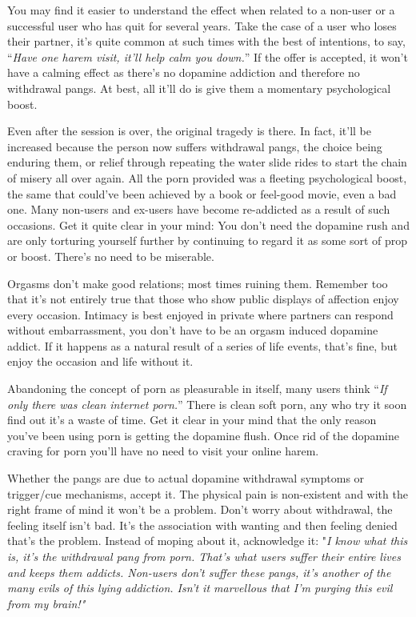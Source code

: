 \documentclass[
]{book}
\begin{document}
You may find it easier to understand the effect when related to a non-user or a successful user who has quit for several years. Take the case of a user who loses their partner, it's quite common at such times with the best of intentions, to say, ``\emph{Have one harem visit, it'll help calm you down.}'' If the offer is accepted, it won't have a calming effect as there's no dopamine addiction and therefore no withdrawal pangs. At best, all it'll do is give them a momentary psychological boost.

Even after the session is over, the original tragedy is there. In fact, it'll be increased because the person now suffers withdrawal pangs, the choice being enduring them, or relief through repeating the water slide rides to start the chain of misery all over again. All the porn provided was a fleeting psychological boost, the same that could've been achieved by a book or feel-good movie, even a bad one. Many non-users and ex-users have become re-addicted as a result of such occasions. Get it quite clear in your mind: You don't need the dopamine rush and are only torturing yourself further by continuing to regard it as some sort of prop or boost. There's no need to be miserable.

Orgasms don't make good relations; most times ruining them. Remember too that it's not entirely true that those who show public displays of affection enjoy every occasion. Intimacy is best enjoyed in private where partners can respond without embarrassment, you don't have to be an orgasm induced dopamine addict. If it happens as a natural result of a series of life events, that's fine, but enjoy the occasion and life without it.

Abandoning the concept of porn as pleasurable in itself, many users think ``\emph{If only there was clean internet porn.}'' There is clean soft porn, any who try it soon find out it's a waste of time. Get it clear in your mind that the only reason you've been using porn is getting the dopamine flush. Once rid of the dopamine craving for porn you'll have no need to visit your online harem.

Whether the pangs are due to actual dopamine withdrawal symptoms or trigger/cue mechanisms, accept it. The physical pain is non-existent and with the right frame of mind it won't be a problem. Don't worry about withdrawal, the feeling itself isn't bad. It's the association with wanting and then feeling denied that's the problem. Instead of moping about it, acknowledge it: "\emph{I know what this is, it's the withdrawal pang from porn. That's what users suffer their entire lives and keeps them addicts. Non-users don't suffer these pangs, it's another of the many evils of this lying addiction. Isn't it marvellous that I'm purging this evil from my brain!"}
\end{document}
